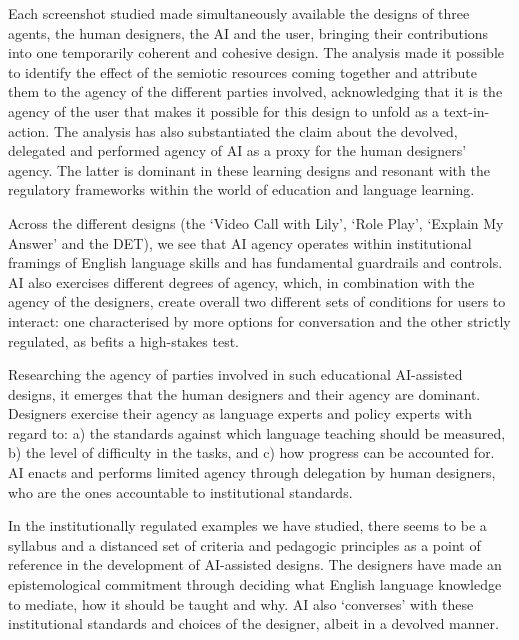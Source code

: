 \documentclass[english]{textolivre}
\begin{document}
Each screenshot studied made simultaneously available the designs of three agents, the human designers, the AI and the user, bringing their contributions into one temporarily coherent and cohesive design. The analysis made it possible to identify the effect of the semiotic resources coming together and attribute them to the agency of the different parties involved, acknowledging that it is the agency of the user that makes it possible for this design to unfold as a text-in-action. The analysis has also substantiated the claim about the devolved, delegated and performed agency of AI as a proxy for the human designers’ agency. The latter is dominant in these learning designs and resonant with the regulatory frameworks within the world of education and language learning.

Across the different designs (the ‘Video Call with Lily’, ‘Role Play’, ‘Explain My Answer’ and the DET), we see that AI agency operates within institutional framings of English language skills and has fundamental guardrails and controls. AI also exercises different degrees of agency, which, in combination with the agency of the designers, create overall two different sets of conditions for users to interact: one characterised by more options for conversation and the other strictly regulated, as befits a high-stakes test.

Researching the agency of parties involved in such educational AI-assisted designs, it emerges that the human designers and their agency are dominant. Designers exercise their agency as language experts and policy experts with regard to: a) the standards against which language teaching should be measured, b) the level of difficulty in the tasks, and c) how progress can be accounted for. AI enacts and performs limited agency through delegation by human designers, who are the ones accountable to institutional standards.

In the institutionally regulated examples we have studied, there seems to be a syllabus and a distanced set of criteria and pedagogic principles as a point of reference in the development of AI-assisted designs. The designers have made an epistemological commitment \cite{bezemer2016multimodality} through deciding what English language knowledge to mediate, how it should be taught and why. AI also ‘converses’ with these institutional standards and choices of the designer, albeit in a devolved manner.
\end{document}
